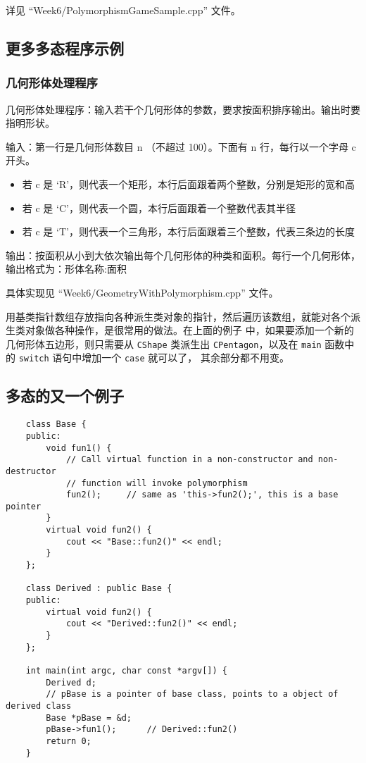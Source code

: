 \documentclass[UTF8]{ctexart}
\begin{document}
详见 ``Week6/PolymorphismGameSample.cpp'' 文件。

\subsection{更多多态程序示例}
\subsubsection{几何形体处理程序}
几何形体处理程序：输入若干个几何形体的参数，要求按面积排序输出。输出时要指明形状。

输入：第一行是几何形体数目 n （不超过 100）。下面有 n 行，每行以一个字母 c 开头。
\begin{itemize}
    \item 若 c 是 ‘R’，则代表一个矩形，本行后面跟着两个整数，分别是矩形的宽和高
    \item 若 c 是 ‘C’，则代表一个圆，本行后面跟着一个整数代表其半径
    \item 若 c 是 ‘T’，则代表一个三角形，本行后面跟着三个整数，代表三条边的长度
\end{itemize}

输出：按面积从小到大依次输出每个几何形体的种类和面积。每行一个几何形体，输出格式为：形体名称:面积

具体实现见 ``Week6/GeometryWithPolymorphism.cpp'' 文件。

用基类指针数组存放指向各种派生类对象的指针，然后遍历该数组，就能对各个派生类对象做各种操作，是很常用的做法。在上面的例子
中，如果要添加一个新的几何形体五边形，则只需要从 \texttt{CShape} 类派生出 \texttt{CPentagon}，以及在
\texttt{main} 函数中的 \texttt{switch} 语句中增加一个 \texttt{case} 就可以了，
其余部分都不用变。

\subsection{多态的又一个例子}
\begin{verbatim}
    class Base {
    public:
        void fun1() {
            // Call virtual function in a non-constructor and non-destructor
            // function will invoke polymorphism
            fun2();     // same as 'this->fun2();', this is a base pointer
        }
        virtual void fun2() {
            cout << "Base::fun2()" << endl;
        }
    };

    class Derived : public Base {
    public:
        virtual void fun2() {
            cout << "Derived::fun2()" << endl;
        }
    };

    int main(int argc, char const *argv[]) {
        Derived d;
        // pBase is a pointer of base class, points to a object of derived class
        Base *pBase = &d;
        pBase->fun1();      // Derived::fun2()
        return 0;
    }
\end{verbatim}
\end{document}
